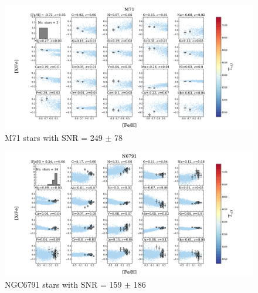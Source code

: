 \documentclass[14pt, preprint2]{aastex6}
\begin{document}
\begin{figure}
\centering
           \includegraphics[scale=0.5]{20elem8_tc2_nofilt.pdf}
  \caption{ M71 stars with SNR = 249 $\pm$ 78}
\label{fig:c5}
\end{figure}


\begin{figure}
\centering
    \includegraphics[scale=0.5]{20elem-3_tc2_nofilt.pdf}
  \caption{ NGC6791 stars with SNR = 159 $\pm$ 186 }
\label{fig:c6}
\end{figure}
\end{document}
